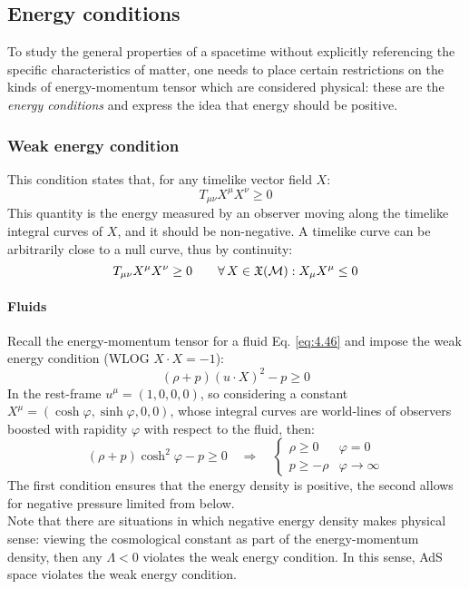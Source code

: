 \subsection{Energy conditions}

To study the general properties of a spacetime without explicitly referencing the specific characteristics of matter, one needs to place certain restrictions on the kinds of energy-momentum tensor which are considered physical: these are the \textit{energy conditions} and express the idea that energy should be positive.

\subsubsection{Weak energy condition}

This condition states that, for any timelike vector field $ X $:
\begin{equation*}
  T_{\mu \nu} X^\mu X^\nu \ge 0
\end{equation*}
This quantity is the energy measured by an observer moving along the timelike integral curves of $ X $, and it should be non-negative. A timelike curve can be arbitrarily close to a null curve, thus by continuity:
\begin{equation}
  T_{\mu \nu} X^\mu X^\nu \ge 0 \qquad \forall\, X \in \mathfrak{X}(\mathcal{M}) : X_\mu X^\mu \le 0
  \label{eq:4.52}
\end{equation}

\paragraph{Fluids}

Recall the energy-momentum tensor for a fluid Eq. \ref{eq:4.46} and impose the weak energy condition (WLOG $ X \cdot X = -1 $):
\begin{equation*}
  (\rho + p) (u \cdot X)^2 - p \ge 0
\end{equation*}
In the rest-frame $ u^\mu = (1,0,0,0) $, so considering a constant $ X^\mu = (\cosh \varphi, \sinh \varphi, 0, 0) $, whose integral curves are world-lines of observers boosted with rapidity $ \varphi $ with respect to the fluid, then:
\begin{equation*}
  (\rho + p) \cosh^2 \varphi - p \ge 0
  \quad \Rightarrow \quad
  \begin{cases}
    \rho \ge 0 & \varphi = 0 \\
    p \ge -\rho & \varphi \rightarrow \infty
  \end{cases}
\end{equation*}
The first condition ensures that the energy density is positive, the second allows for negative pressure limited from below.\\
Note that there are situations in which negative energy density makes physical sense: viewing the cosmological constant as part of the energy-momentum density, then any $ \Lambda < 0 $ violates the weak energy condition. In this sense, AdS space violates the weak energy condition.

